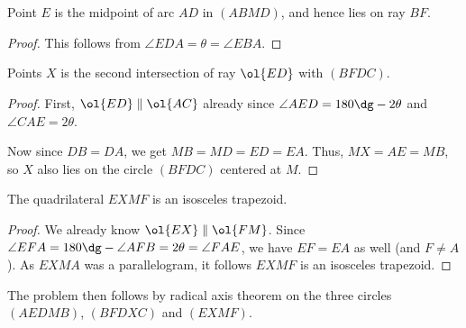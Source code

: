 \begin{claim*}
  Point $E$ is the midpoint of arc $\widehat{AD}$
  in $(ABMD)$, and hence lies on ray $BF$.
\end{claim*}
\begin{proof}
  This follows from
  $\angle EDA = \theta = \angle EBA$.
\end{proof}


\begin{claim*}
  Points $X$ is the second intersection of ray $\ol{ED}$
  with $(BFDC)$.
\end{claim*}
\begin{proof}
  First, $\ol{ED} \parallel \ol{AC}$ already since
  $\angle AED = 180\dg - 2\theta$
  and $\angle CAE = 2\theta$.

  Now since $DB = DA$, we get $MB = MD = ED = EA$.
  Thus, $MX = AE = MB$,
  so $X$ also lies on the circle $(BFDC)$ centered at $M$.
\end{proof}

\begin{claim*}
  The quadrilateral $EXMF$ is an isosceles trapezoid.
\end{claim*}
\begin{proof}
  We already know $\ol{EX} \parallel \ol{FM}$.
  Since $\angle EFA = 180\dg - \angle AFB = 2\theta = \angle FAE$,
  we have $EF = EA$ as well (and $F \neq A$).
  As $EXMA$ was a parallelogram,
  it follows $EXMF$ is an isosceles trapezoid.
\end{proof}

The problem then follows by radical axis theorem
on the three circles $(AEDMB)$, $(BFDXC)$ and $(EXMF)$.
